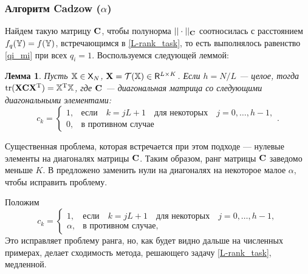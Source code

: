 \documentclass[12pt,a4paper,fleqn,leqno]{article}
\DeclareMathOperator{\tr}{tr}
\begin{document}
\subsubsection{Алгоритм Cadzow ($\alpha$)}
\label{sec:cadzow_alpha}
Найдем такую матрицу $\mathbf{C}$, чтобы полунорма $||\cdot||_{\mathbf{C}}$ соотносилась с расстоянием $f_q(\mathbb{Y}) = f(\mathbb{Y})$, встречающимся в \eqref{L-rank_task}, то есть выполнялось равенство \eqref{qi_mi} при всех $q_i = 1$. Воспользуемся следующей леммой:
\newtheorem{lemma}{Лемма}
\begin{lemma}\label{zhiglemma}\cite{Gillard2014}
Пусть $\mathbb{X} \in \mathsf{X}_N$, $\mathbf{X} = \mathcal{T}(\mathbb{X}) \in \mathsf{R}^{L \times K}$. Если $h = N/L$ --- целое, тогда $\tr(\bfX \bfC \bfX^\rmT) = \tsX^\rmT \tsX$, где $\mathbf{C}$ --- диагональная матрица со следующими диагональными элементами:
\begin{equation*}
c_k = \begin{cases}
1, & \text{если} \quad k = jL+1 \quad \text{для некоторых} \quad j = 0, \ldots, h-1, \\
0, & \text{в противном случае}
\end{cases}.
\end{equation*}
\end{lemma}

Существенная проблема, которая встречается при этом подходе --- нулевые элементы на диагоналях матрицы $\mathbf{C}$. Таким образом, ранг матрицы $\mathbf{C}$ заведомо меньше $K$. В \cite{Gillard2014} предложено заменить нули на диагоналях на некоторое малое $\alpha$, чтобы исправить проблему.

Положим
\begin{equation}\label{zhigweights}
c_k = \begin{cases}
1, & \text{если} \quad k = jL+1 \quad \text{для некоторых} \quad j = 0, \ldots, h-1, \\
\alpha, & \text{в противном случае,}
\end{cases}
\end{equation}
Это исправляет проблему ранга, но, как будет видно дальше на численных примерах, делает сходимость метода, решающего задачу \eqref{L-rank_task}, медленной.
\end{document}

